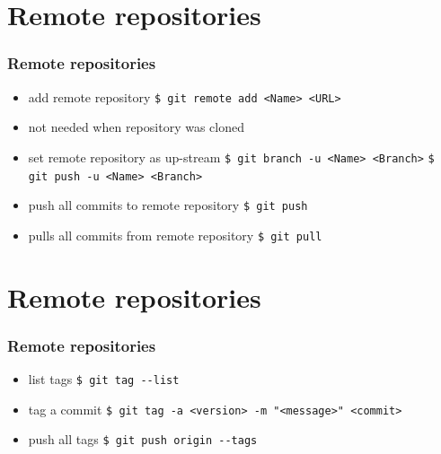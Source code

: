 \documentclass{beamer}
\begin{document}
	\section{Remote repositories}
	\begin{frame}
		\frametitle{Remote repositories}\pause
		\begin{itemize}
			\item add remote repository\newline
			\lstinline|$ git remote add <Name> <URL>| \pause
			\item not needed when repository was cloned \pause
			\item set remote repository as up-stream\newline
			\lstinline|$ git branch -u <Name> <Branch>|\newline
			\lstinline|$ git push -u <Name> <Branch>| \pause
			\item push all commits to remote repository\newline
			\lstinline|$ git push| \pause
			\item pulls all commits from remote repository\newline
			\lstinline|$ git pull| 
		\end{itemize}
	\end{frame}

	\section{Remote repositories}
	\begin{frame}
		\frametitle{Remote repositories}\pause
		\begin{itemize}
			\item list tags\newline
			\lstinline|$ git tag --list| \pause
			\item tag a commit\newline
			\lstinline|$ git tag -a <version> -m "<message>" <commit>| \pause
			\item push all tags\newline
			\lstinline|$ git push origin --tags|
		\end{itemize}
	\end{frame}
\end{document}
